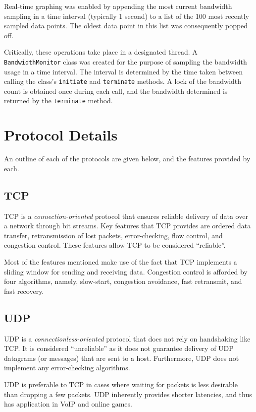\documentclass[10pt,a4paper]{article}
\begin{document}
Real-time graphing was enabled by appending the most current bandwidth sampling in a time interval (typically 1 second)
to a list of the 100 most recently sampled data points. The oldest data point in this list was consequently popped off.

Critically, these operations take place in a designated thread. A \texttt{BandwidthMonitor} class was created for the purpose
of sampling the bandwidth usage in a time interval. The interval is determined by the time taken between calling the class's 
\texttt{initiate} and \texttt{terminate} methods. A lock of the bandwidth count is obtained once during each call, and the
bandwidth determined is returned by the \texttt{terminate} method.

\section{Protocol Details}
An outline of each of the protocols are given below, and the features provided by each. 

\subsection{TCP}
TCP is a \emph{connection-oriented} protocol that ensures reliable delivery of data over a network through bit streams. Key features
that TCP provides are ordered data transfer, retransmission of lost packets, error-checking, flow control, and congestion control. 
These features allow TCP to be considered ``reliable''. 

Most of the features mentioned make use of the fact that TCP implements a sliding
window for sending and receiving data. Congestion control is afforded by four algorithms, namely, slow-start, congestion avoidance,
fast retransmit, and fast recovery. 

\subsection{UDP}
UDP is a \emph{connectionless-oriented} protocol that does not rely on handshaking like TCP. It is considered ``unreliable'' as it 
does not guarantee delivery of UDP datagrams (or messages) that are sent to a host. Furthermore, UDP does not implement
any error-checking algorithms.

UDP is preferable to TCP in cases where waiting for packets is less desirable than dropping a few packets. UDP inherently provides
shorter latencies, and thus has application in VoIP and online games. 
\end{document}
